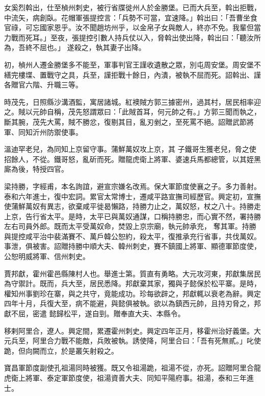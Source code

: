\begin{pinyinscope}
 女奚烈斡出，仕至楨州刺史，被行省牒徙州人於金勝堡。已而大兵至，斡出拒戰，中流矢，病創臥。花帽軍張提控言：「兵勢不可當，宜速降。」斡出曰：「吾曹坐食官祿，可忘國家恩乎。汝不聞趙坊州乎，以金帛子女與敵人，終亦不免。我輩但當力戰而死耳。」至夜，張提控引數人持兵仗以入，脅斡出使出降，斡出曰：「聽汝所為，吾終不屈也。」
 遂殺之，執其妻子出降。



 初，楨州人遷金勝堡多不能至，軍事判官王謹收遺散之眾，別屯周安堡。周安堡不繕完樓堞、置戰守之具，兵至，謹拒戰十餘日，內潰，被執不屈而死。詔斡出、謹各贈官六階、升職三等。



 時茂先，日照縣沙溝酒監，寓居諸城。紅襖賊方郭三據密州，過其村，居民相率迎之。賊以元帥自稱，茂先怒謂眾曰：「此賊首耳，何元帥之有。」方郭三聞而執之，斷其腕，茂先大罵，賊不勝忿，復剔其目，亂刃剉之，至死罵不絕。詔贈武節將軍、同知沂州防禦使事。



 溫迪罕老兒，為同知上京留守事。蒲鮮萬奴攻上京，其
 子鐵哥生獲老兒，脅之使招餘人，不從。鐵哥怒，亂斫而死。贈龍虎衛上將軍、婆速兵馬都總管，以其姪黑廝為後，特授四官。



 梁持勝，字經甫，本名詢誼，避宣宗嫌名改焉。保大軍節度使襄之子。多力善射。泰和六年進士，復中宏詞。累官太常博士，遷咸平路宣撫司經歷官。興定初，宣撫使蒲鮮萬奴有異志，欲棄咸平徙曷懶路，持勝力止之，萬奴怒，杖之八十。持勝走上京，告行省太平。是時，太平已與萬奴通謀，口稱持勝忠，而心實不然，署持勝左右司員外郎。既而太平受萬奴命，焚毀上京宗廟，執元帥承充，
 奪其軍。持勝與提控咸平治中裴滿賽不、萬戶韓公恕約，殺太平，復推承充行省事，共伐萬奴。事泄，俱被害。詔贈持勝中順大夫、韓州刺史，賽不鎮國上將軍、顯德軍節度使，公恕明威將軍、信州刺史。



 賈邦獻，霍州霍邑縣陳村人也。舉進士第。質直有勇略。大元攻河東，邦獻集居民為守禦計。既而，兵大至，居民悉降。邦獻棄其家，獨與子懿保於松平寨。是時，權知州事劉珍在寨，與之共守，竟能成功。珍每欲辟之，邦獻輒以衰老為辭。興定四年十月，兵復大至，病不能避，與懿俱被執。欲以為鎮西元帥，且持刃脅之，邦獻不屈，密遣
 懿歸松平，遂自剄。贈奉直大夫、本縣令。



 移剌阿里合，遼人。興定間，累遷霍州刺史。興定四年正月，移霍州治好義堡。大元兵至，阿里合力戰不能敵，兵敗被執。誘使降，阿里合曰：「吾有死無貳。」叱使跪，但向闕而立，於是叢矢射殺之。



 寶昌軍節度副使孔祖湯同時被獲。既又令祖湯跪，祖湯不從，亦死。詔贈阿里合龍虎衛上將軍、泰定軍節度使，祖湯資善大夫、同知平陽府事。祖湯，泰和三年進士。




\end{pinyinscope}
